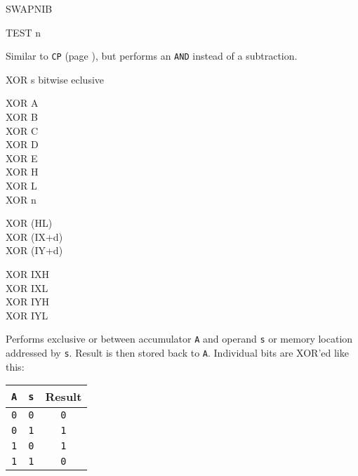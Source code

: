\documentclass[12pt,twoside,openright,a4paper]{book}
\begin{document}
\begin{basedescript}{
	\desclabelstyle{\multilinelabel}
	\desclabelwidth{3cm}}
\begin{DetailItem}{SWAPNIB\ZXN}
	\end{DetailItem}

	\begin{DetailItem}{TEST n\ZXN}
		{}
		{\SymTEST}

		Similar to {\tt CP} (page \pageref{DetailRefCP}), but performs an {\tt AND} instead of a subtraction.

		\begin{DetailEffects}[v]
			\FlagsTESTn
		\end{DetailEffects}
						
		\begin{DetailTiming}
		\end{DetailTiming}

	\end{DetailItem}

	\pagebreak
	\begin{DetailItem}{XOR s}
		{bitwise eclusive }
		{}

		\begin{DetailVariants}
			XOR A\\
			XOR B\\
			XOR C\\
			XOR D\\
			XOR E\\
			XOR H\\
			XOR L\\
			XOR n

			\columnbreak
			XOR (HL)\\
			XOR (IX+d)\\
			XOR (IY+d)

			\columnbreak
			XOR IXH\UNDOC\\
			XOR IXL\UNDOC\\
			XOR IYH\UNDOC\\
			XOR IYL\UNDOC
		\end{DetailVariants}

		Performs exclusive or between accumulator {\tt A} and operand {\tt s} or memory location addressed by {\tt s}. Result is then stored back to {\tt A}. Individual bits are XOR'ed like this:

		\begin{tabular}{cc|c}
			{\tt A} & {\tt s} & Result \\
			\hline
			{\tt 0} & {\tt 0} & {\tt 0} \\
			{\tt 0} & {\tt 1} & {\tt 1} \\
			{\tt 1} & {\tt 0} & {\tt 1} \\
			{\tt 1} & {\tt 1} & {\tt 0} \\
		\end{tabular}


\end{DetailItem}
\end{basedescript}
\end{document}
